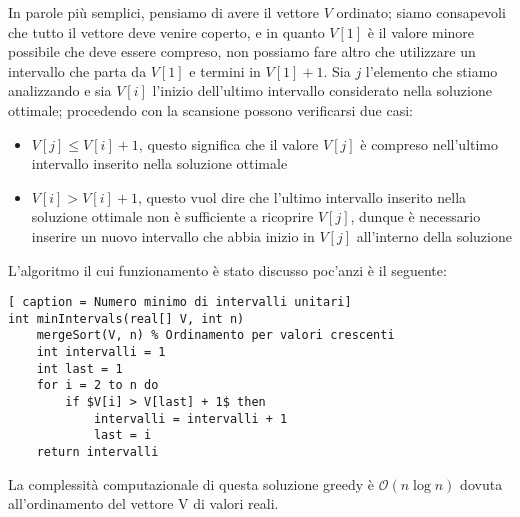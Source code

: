 \documentclass[../cheatSheetAlgoritmi.tex]{subfiles}
\begin{document}
In parole più semplici, pensiamo di avere il vettore $V$ ordinato; siamo consapevoli che tutto il vettore deve venire coperto, e in quanto $V[1]$ è il valore minore possibile che deve essere compreso, non possiamo fare altro che utilizzare un intervallo che parta da $V[1]$ e termini in $V[1] + 1$. Sia $j$ l'elemento che stiamo analizzando e sia $V[i]$ l'inizio dell'ultimo intervallo considerato nella soluzione ottimale; procedendo con la scansione possono verificarsi due casi:
\begin{itemize}
	\item $V[j] \leq V[i] + 1$, questo significa che il valore $V[j]$ è compreso nell'ultimo intervallo inserito nella soluzione ottimale
	\item $V[i] > V[i] + 1$, questo vuol dire che l'ultimo intervallo inserito nella soluzione ottimale non è sufficiente a ricoprire $V[j]$, dunque è necessario inserire un nuovo intervallo che abbia inizio in $V[j]$ all'interno della soluzione
\end{itemize}
L'algoritmo il cui funzionamento è stato discusso poc'anzi è il seguente:
\begin{lstlisting}[ caption = Numero minimo di intervalli unitari]
int minIntervals(real[] V, int n)
	mergeSort(V, n) % Ordinamento per valori crescenti
	int intervalli = 1
	int last = 1
	for i = 2 to n do
		if $V[i] > V[last] + 1$ then
			intervalli = intervalli + 1
			last = i
	return intervalli
\end{lstlisting}
La complessità computazionale di questa soluzione greedy è $\mathcal{O}(n \log n)$ dovuta all'ordinamento del vettore V di valori reali.
 
\end{document}
